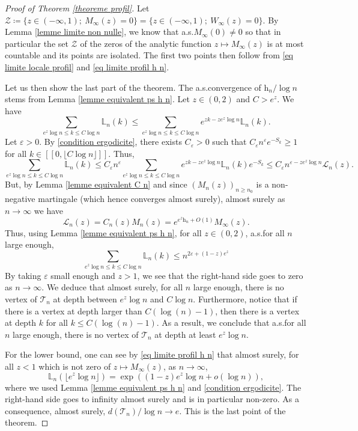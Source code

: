 \documentclass[11pt]{article}
\numberwithin{equation}{section}
\def\vp{\varepsilon}
\def \T{\mathcal{T}}
\def \cL{\mathcal{L}}
\def\lb{[\![}
\def\rb{]\!]}
\begin{document}
\begin{proof}[Proof of Theorem \ref{theoreme profil}]
	Let $\mathcal{Z} \coloneqq \{ z \in (-\infty, 1); \ M_\infty(z) =0\} = \{ z \in (-\infty, 1); \ W_\infty(z) =0\} $. By Lemma \ref{lemme limite non nulle}, we know that a.s.\@ $M_\infty(0)\neq 0 $ so that in particular the set $\mathcal{Z}$ of the zeros of the analytic function $z \mapsto M_\infty(z)$ is at most countable and its points are isolated. The first two points then follow from \eqref{eq limite locale profil} and \eqref{eq limite profil h n}.
	
	
	Let us then show the last part of the theorem. The a.s.\@ convergence of $\mathrm{h}_n/\log n$ stems from Lemma \ref{lemme equivalent ps h n}. Let $z\in (0,2)$ and $C>e^z$. We have
	\[
	\sum_{ e^z \log n\le k \le C \log n} \mathbb{L}_n(k)  \le  \sum_{ e^z \log n\le k \le C \log n} e^{zk - ze^z \log n} \mathbb{L}_n(k).
	\]
	Let $\vp>0$. By \eqref{condition ergodicite}, there exists $C_\vp >0$ such that $C_\vp n^\vp e^{-S_{k}}\ge 1$ for all $k \in \lb0, \lfloor C \log n \rfloor \rb$. Thus, 
	\[
	\sum_{ e^z \log n\le k \le C \log n} \mathbb{L}_n(k)  \le C_\vp n^\vp \sum_{ e^z \log n\le k \le C \log n} e^{zk - ze^z \log n} \mathbb{L}_n(k) e^{-S_k}\le C_\vp n^{\vp -ze^z \log n} \cL_n(z).
	\]
	But, by Lemma \ref{lemme equivalent C n} and since $(M_n(z))_{n\ge n_0}$ is a non-negative martingale (which hence converges almost surely), almost surely as $n\to \infty$ we have
	\begin{equation}\label{eq equivalement L n avec exp h n}
	\cL_n(z)  = C_n(z) M_n(z)  =e^{e^z\mathrm{h}_n + O(1)} M_\infty(z).
	\end{equation}
	Thus, using Lemma \ref{lemme equivalent ps h n}, for all $z \in (0,2)$, a.s.\@ for all $n$ large enough,
	\begin{equation}\label{eq pas de sommet trop haut 0}
		\sum_{ e^z \log n\le k \le C \log n} \mathbb{L}_n(k)  \le n^{2 \vp+ (1-z)e^z}
	\end{equation}
	By taking $\vp$ small enough and $z>1$, we see that the right-hand side goes to zero as $n\to \infty$. 
	We deduce that almost surely, for all $n$ large enough, there is no vertex of $\T_n$ at depth between $e^z \log n$ and $C\log n$. Furthermore, notice that if there is a vertex at depth larger than $C(\log(n)-1)$, then there is a vertex at depth $k$ for all $k\le C(\log(n)-1)$. As a result, 
	we conclude that a.s.\@ for all $n$ large enough, there is no vertex of $\T_n$ at depth at least $e^z \log n$.
	
	For the lower bound, one can see by \eqref{eq limite profil h n} that almost surely, for all $z<1$ which is not zero of $z \mapsto M_\infty(z)$, as $n\to \infty$,
	\[
	\mathbb{L}_n(\lfloor e^z \log n \rfloor) = \exp \left( (1-z)e^z \log n + o(\log n) \right),
	\]
	where we used Lemma \ref{lemme equivalent ps h n} and \eqref{condition ergodicite}. The right-hand side goes to infinity almost surely and is in particular non-zero. As a consequence, almost surely, $d(\T_n)/\log n \to e$. This is the last point of the theorem.
\end{proof}
\end{document}
